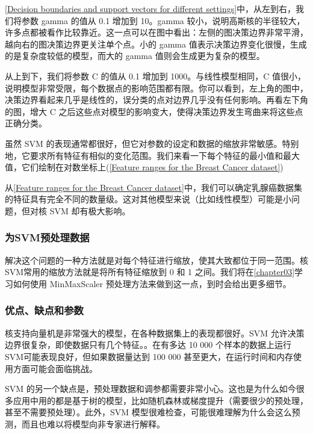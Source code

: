 \autoref{Decision boundaries and support vectors for different settings}中，从左到右，我们将参数 gamma 的值从 0.1 增加到 10。gamma 较小，说明高斯核的半径较大，许多点都被看作比较靠近。这一点可以在图中看出：左侧的图决策边界非常平滑，越向右的图决策边界更关注单个点。小的 gamma 值表示决策边界变化很慢，生成的是复杂度较低的模型，而大的 gamma 值则会生成更为复杂的模型。

从上到下，我们将参数 C 的值从 0.1 增加到 1000。与线性模型相同，C 值很小，说明模型非常受限，每个数据点的影响范围都有限。你可以看到，左上角的图中，决策边界看起来几乎是线性的，误分类的点对边界几乎没有任何影响。再看左下角的图，增大 C 之后这些点对模型的影响变大，使得决策边界发生弯曲来将这些点正确分类。

虽然 SVM 的表现通常都很好，但它对参数的设定和数据的缩放非常敏感。特别地，它要求所有特征有相似的变化范围。我们来看一下每个特征的最小值和最大值，它们绘制在对数坐标上(\autoref{Feature ranges for the Breast Cancer dataset})


从\autoref{Feature ranges for the Breast Cancer dataset}中，我们可以确定乳腺癌数据集的特征具有完全不同的数量级。这对其他模型来说（比如线性模型）可能是小问题，但对核 SVM 却有极大影响。

\subsubsection{为SVM预处理数据}
解决这个问题的一种方法就是对每个特征进行缩放，使其大致都位于同一范围。核 SVM常用的缩放方法就是将所有特征缩放到 0 和 1 之间。我们将在\autoref{chapter03}学习如何使用 MinMaxScaler 预处理方法来做到这一点，到时会给出更多细节。

\subsubsection{优点、缺点和参数}
核支持向量机是非常强大的模型，在各种数据集上的表现都很好。SVM 允许决策边界很复杂，即使数据只有几个特征。。在有多达 10 000 个样本的数据上运行 SVM可能表现良好，但如果数据量达到 100 000 甚至更大，在运行时间和内存使用方面可能会面临挑战。

SVM 的另一个缺点是，预处理数据和调参都需要非常小心。这也是为什么如今很多应用中用的都是基于树的模型，比如随机森林或梯度提升（需要很少的预处理，甚至不需要预处理）。此外，SVM 模型很难检查，可能很难理解为什么会这么预测，而且也难以将模型向非专家进行解释。


